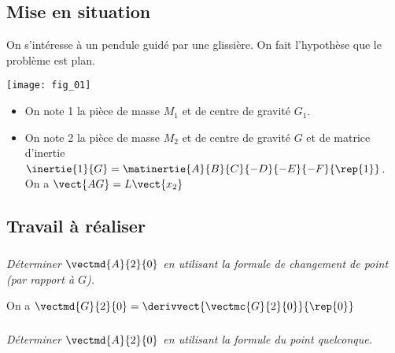 \ifprof
\else
\begin{multicols}{2}
\fi

\subsection*{Mise en situation}
On s'intéresse à un pendule guidé par une glissière. On fait l'hypothèse que le problème est plan. 

\begin{center}
\texttt{[image: fig\_01]}
\end{center}
\begin{itemize}
\item On note 1 la pièce de masse $M_1$ et de centre de gravité $G_1$.
\item On note 2 la pièce de masse $M_2$ et de centre de gravité $G$ et de matrice d'inertie $\inertie{1}{G}= \matinertie{A}{B}{C}{-D}{-E}{-F}{\rep{1}}$. On a $\vect{AG}=L\vect{x_2}$
\end{itemize}

\subsection*{Travail à réaliser}

\subparagraph{}
\textit{Déterminer $\vectmd{A}{2}{0}$ en utilisant la formule de changement de point (par rapport à $G$). }
\ifprof
\begin{corrige}
On a $\vectmd{G}{2}{0} = \derivvect{\vectmc{G}{2}{0}}{\rep{0}} $
\end{corrige}
\else
\fi



\subparagraph{}
\textit{Déterminer $\vectmd{A}{2}{0}$ en utilisant la formule du point quelconque. }
\ifprof
\begin{corrige}
\end{corrige}
\else
\fi



\ifprof
\else
\end{multicols}
\fi

